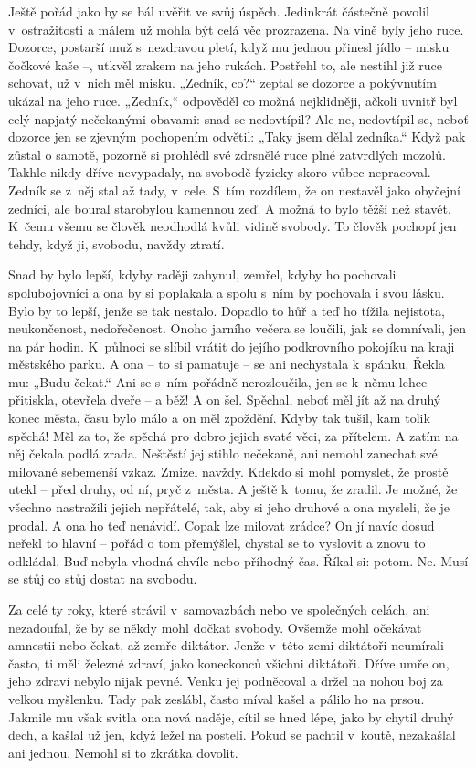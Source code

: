 Ještě pořád jako by se bál uvěřit ve svůj úspěch. Jedinkrát částečně povolil v ostražitosti a málem už mohla být celá věc prozrazena. Na vině byly jeho ruce. Dozorce, postarší muž s nezdravou pletí, když mu jednou přinesl jídlo -- misku čočkové kaše --, utkvěl zrakem na jeho rukách. Postřehl to, ale nestihl již ruce schovat, už v nich měl misku. „Zedník, co?“ zeptal se dozorce a pokývnutím ukázal na jeho ruce. „Zedník,“ odpověděl co možná nejklidněji, ačkoli uvnitř byl celý napjatý nečekanými obavami: snad se nedovtípil? Ale ne, nedovtípil se, neboť dozorce jen se zjevným pochopením odvětil: „Taky jsem dělal zedníka.“ Když pak zůstal o samotě, pozorně si prohlédl své zdrsnělé ruce plné zatvrdlých mozolů. Takhle nikdy dříve nevypadaly, na svobodě fyzicky skoro vůbec nepracoval. Zedník se z něj stal až tady, v cele. S tím rozdílem, že on nestavěl jako obyčejní zedníci, ale boural starobylou kamennou zeď. A možná to bylo těžší než stavět. K čemu všemu se člověk neodhodlá kvůli vidině svobody. To člověk pochopí jen tehdy, když ji, svobodu, navždy ztratí.

Snad by bylo lepší, kdyby raději zahynul, zemřel, kdyby ho pochovali spolubojovníci a ona by si poplakala a spolu s ním by pochovala i svou lásku. Bylo by to lepší, jenže se tak nestalo. Dopadlo to hůř a teď ho tížila nejistota, neukončenost, nedořečenost. Onoho jarního večera se loučili, jak se domnívali, jen na pár hodin. K půlnoci se slíbil vrátit do jejího podkrovního pokojíku na kraji městského parku. A ona -- to si pamatuje -- se ani nechystala k spánku. Řekla mu: „Budu čekat.“ Ani se s ním pořádně nerozloučila, jen se k němu lehce přitiskla, otevřela dveře -- a běž! A on šel. Spěchal, neboť měl jít až na druhý konec města, času bylo málo a on měl zpoždění. Kdyby tak tušil, kam tolik spěchá! Měl za to, že spěchá pro dobro jejich svaté věci, za přítelem. A zatím na něj čekala podlá zrada. Neštěstí jej stihlo nečekaně, ani nemohl zanechat své milované sebemenší vzkaz. Zmizel navždy. Kdekdo si mohl pomyslet, že prostě utekl -- před druhy, od ní, pryč z města. A ještě k tomu, že zradil. Je možné, že všechno nastražili jejich nepřátelé, tak, aby si jeho druhové a ona mysleli, že je prodal. A ona ho teď nenávidí. Copak lze milovat zrádce? On jí navíc dosud neřekl to hlavní -- pořád o tom přemýšlel, chystal se to vyslovit a znovu to odkládal. Buď nebyla vhodná chvíle nebo příhodný čas. Říkal si: potom. Ne. Musí se stůj co stůj dostat na svobodu.

Za celé ty roky, které strávil v samovazbách nebo ve společných celách, ani nezadoufal, že by se někdy mohl dočkat svobody. Ovšemže mohl očekávat amnestii nebo čekat, až zemře diktátor. Jen\-že v této zemi diktátoři neumírali často, ti měli železné zdraví, jako koneckonců všichni diktátoři. Dříve umře on, jeho zdraví nebylo nijak pevné. Venku jej podněcoval a držel na nohou boj za velkou myšlenku. Tady pak zeslábl, často míval kašel a pálilo ho na prsou. Jakmile mu však svitla ona nová naděje, cítil se hned lépe, jako by chytil druhý dech, a kašlal už jen, když ležel na posteli. Pokud se pachtil v koutě, nezakašlal ani jednou. Nemohl si to zkrátka dovolit.

